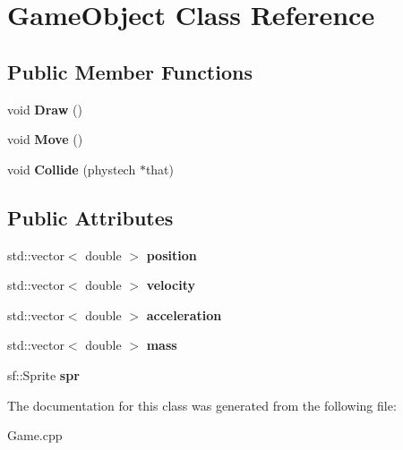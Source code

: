 \hypertarget{class_game_object}{}\section{Game\+Object Class Reference}
\label{class_game_object}
\subsection*{Public Member Functions}
\begin{DoxyCompactItemize}
\item 
\mbox{\label{class_game_object_ad3ac1deac50048cf7a1a19eb0e61ad26}} 
void {\bfseries Draw} ()
\item 
\mbox{\label{class_game_object_ab4436b570af026dae6007f44839bd8e5}} 
void {\bfseries Move} ()
\item 
\mbox{\label{class_game_object_a000bddf0e0dfb1bbb0f16951cc78d7f1}} 
void {\bfseries Collide} (phystech $\ast$that)
\end{DoxyCompactItemize}
\subsection*{Public Attributes}
\begin{DoxyCompactItemize}
\item 
\mbox{\label{class_game_object_afddac54595d19a925bd6346769652abb}} 
std\+::vector$<$ double $>$ {\bfseries position}
\item 
\mbox{\label{class_game_object_a26563582dc9aed0a6faa15b33618c766}} 
std\+::vector$<$ double $>$ {\bfseries velocity}
\item 
\mbox{\label{class_game_object_a0e640ab7f9c82c41728e88079f00af1a}} 
std\+::vector$<$ double $>$ {\bfseries acceleration}
\item 
\mbox{\label{class_game_object_a2db2ed0382dcd0bd36a6e01afd49fe36}} 
std\+::vector$<$ double $>$ {\bfseries mass}
\item 
\mbox{\label{class_game_object_a70da55d7631b506a91309249f9eb2e0f}} 
sf\+::\+Sprite {\bfseries spr}
\end{DoxyCompactItemize}


The documentation for this class was generated from the following file\+:\begin{DoxyCompactItemize}
\item 
Game.\+cpp\end{DoxyCompactItemize}
